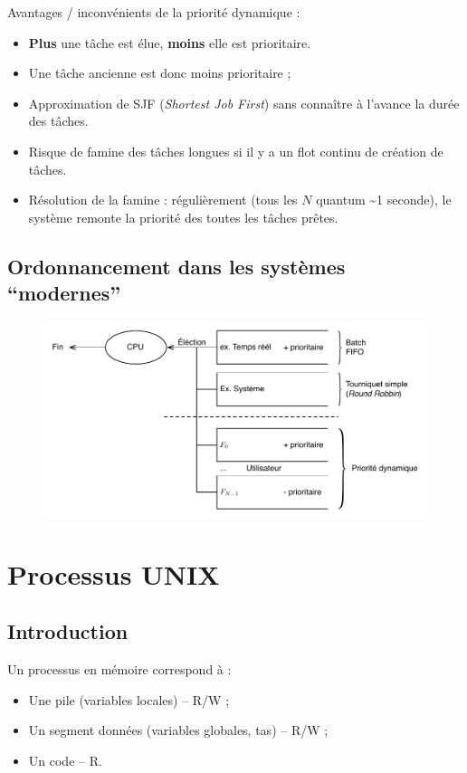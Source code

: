 \documentclass[11pt,english,french]{scrreprt}
\theoremstyle{remark}
\theoremstyle{definition}
\newcommand*\Pitem{%
  \item[\color{green}\scalebox{0.9}{\textbullet}]}
\newcommand*\Citem{%
  \item[\color{red}\scalebox{0.9}{\textbullet}]}
\begin{document}
Avantages / inconvénients de la priorité dynamique :\begin{itemize}
	\Pitem \textbf{Plus} une tâche est élue, \textbf{moins} elle est prioritaire.
	\Pitem Une tâche ancienne est donc moins prioritaire ;
	\Pitem Approximation de SJF (\emph{Shortest Job First}) sans connaître à l'avance la durée des tâches.
	\Citem Risque de famine des tâches longues si il y a un flot continu de création de tâches.
	\Citem Résolution de la famine : régulièrement (tous les $N$ quantum \textasciitilde 1 seconde), le système remonte la priorité des toutes les tâches prêtes.
\end{itemize}

\section{Ordonnancement dans les systèmes ``modernes''} %
\begin{figure}[h!]
	\center
	\includegraphics[scale=.65]{img/systeme-moderne}
	\vspace{-20pt}
\end{figure}

\chapter{Processus UNIX} %
\section{Introduction} %

Un processus en mémoire correspond à :\begin{itemize}
	\item Une pile (variables locales) -- R/W ;
	\item Un segment données (variables globales, tas) -- R/W ;
	\item Un code -- R.
\end{itemize}
\end{document}
